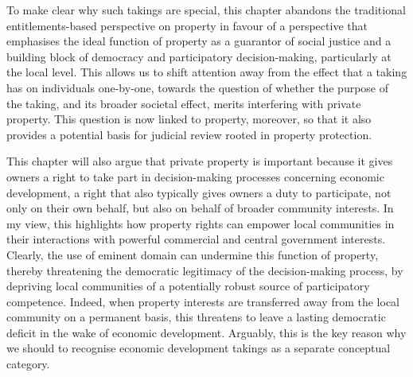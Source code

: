 To make clear why such takings are special, this chapter abandons the traditional entitlements-based perspective on property in favour of a perspective that emphasises the ideal function of property as a guarantor of social justice and a building block of democracy and participatory decision-making, particularly at the local level. This allows us to shift attention away from the effect that a taking has on individuals one-by-one, towards the question of whether the purpose of the taking, and its broader societal effect, merits interfering with private property. This question is now linked to property, moreover, so that it also provides a potential basis for judicial review rooted in property protection.

This chapter will also argue that private property is important because it gives owners a right to take part in decision-making processes concerning economic development, a right that also typically gives owners a duty to participate, not only on their own behalf, but also on behalf of broader community interests. In my view, this highlights how property rights can empower local communities in their interactions with powerful commercial and central government interests. Clearly, the use of eminent domain can undermine this function of property, thereby threatening the democratic legitimacy of the decision-making process, by depriving local communities of a potentially robust source of participatory competence. Indeed, when property interests are transferred away from the local community on a permanent basis, this threatens to leave a lasting democratic deficit in the wake of economic development. Arguably, this is the key reason why we should to recognise economic development takings as a separate conceptual category.

